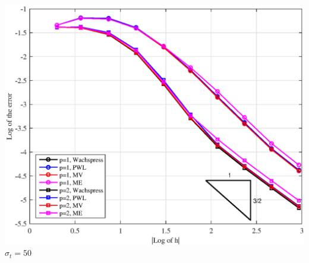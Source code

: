 \documentclass[compress,10pt]{beamer}
\begin{document}
\begin{frame}[t]
{\begin{columns}[c]
{}\includegraphics[width=\textwidth]{images/PAErr_LeftTop_Poly_sig50.eps} \\
$\sigma_t = 50$
\end{columns}
}
\end{frame}
\end{document}
